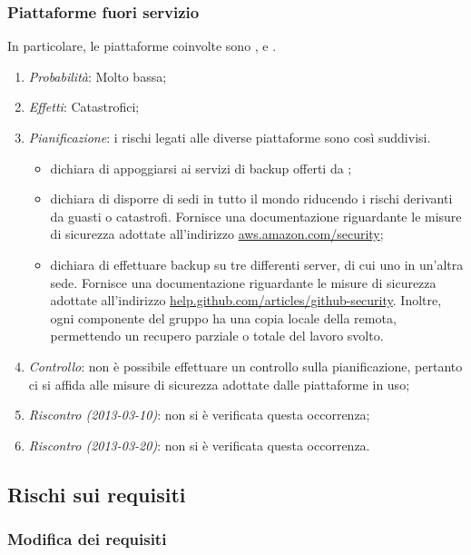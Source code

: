 		\subsubsection{Piattaforme fuori servizio}	

In particolare, le piattaforme coinvolte sono ,  e . 

\begin{enumerate}
\item \textit{Probabilità}: Molto bassa;
\item \textit{Effetti}: Catastrofici;
\item \textit{Pianificazione}: i rischi legati alle diverse piattaforme sono così suddivisi.

	\begin{itemize}
	\item {} dichiara di appoggiarsi ai servizi di backup offerti da ;
	\item {} dichiara di disporre di sedi in tutto il mondo riducendo i rischi derivanti da guasti o catastrofi. Fornisce una documentazione riguardante le misure di sicurezza adottate all'indirizzo \url{aws.amazon.com/security};
	\item {} dichiara di effettuare backup su tre differenti server,  di cui uno in un'altra sede. Fornisce una documentazione riguardante le misure di sicurezza adottate all'indirizzo \url{help.github.com/articles/github-security}. Inoltre, ogni componente del gruppo ha una copia locale della  remota, permettendo un recupero parziale o totale del lavoro svolto. 
	\end{itemize}
\item \textit{Controllo}: non è possibile effettuare un controllo sulla pianificazione, pertanto ci si affida alle misure di sicurezza adottate dalle piattaforme in uso;
\item \textit{Riscontro (2013-03-10)}: non si è verificata questa occorrenza;
\item \textit{Riscontro (2013-03-20)}: non si è verificata questa occorrenza.
\end{enumerate}
	
	\subsection{Rischi sui requisiti}
	
		\subsubsection{Modifica dei requisiti}
		
